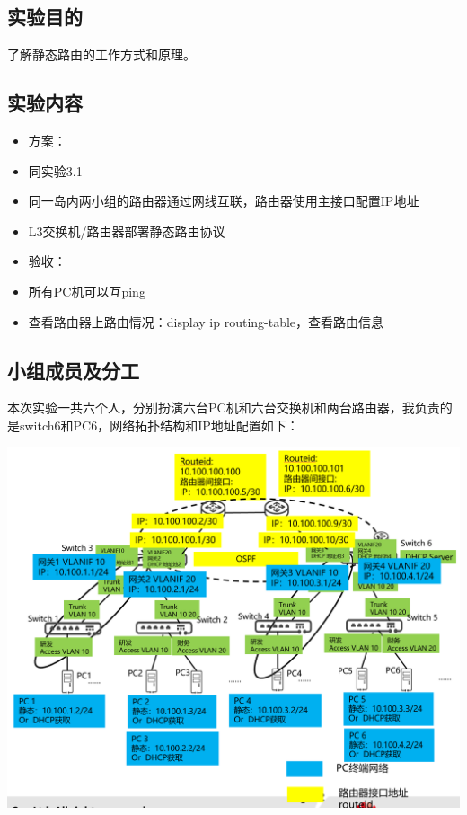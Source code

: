 \documentclass{article}
\begin{document}
\subsection{实验目的}
了解静态路由的工作方式和原理。

\subsection{实验内容}
\begin{itemize}
    \item 方案：
    \item 同实验3.1
    \item 同一岛内两小组的路由器通过网线互联，路由器使用主接口配置IP地址
    \item L3交换机/路由器部署静态路由协议
    \item 验收：
    \item 所有PC机可以互ping
    \item 查看路由器上路由情况：display ip routing-table，查看路由信息
\end{itemize}

\subsection{小组成员及分工}
本次实验一共六个人，分别扮演六台PC机和六台交换机和两台路由器，我负责的是switch6和PC6，网络拓扑结构和IP地址配置如下：

\vspace{10pt}
\centerline{\includegraphics[width=1\textwidth]{4_1_images/1.png}}
\vspace{10pt}
\end{document}
